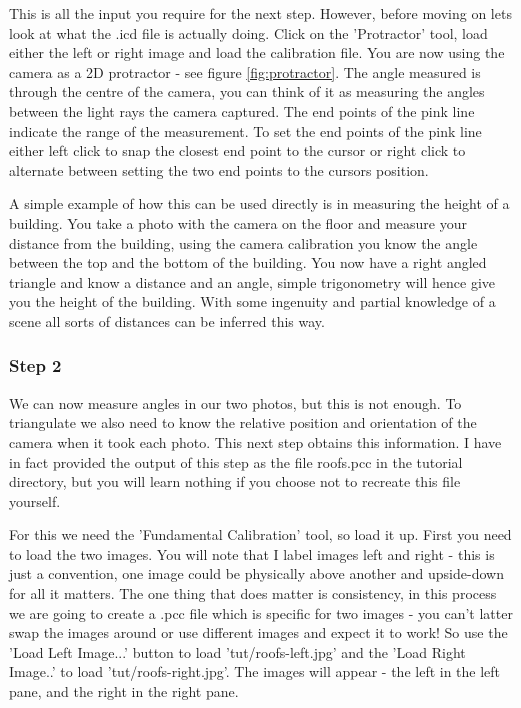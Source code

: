 \documentclass[10pt,a4paper,twoside]{article}
\begin{document}
This is all the input you require for the next step. However, before moving on lets look at what the .icd file is actually doing. Click on the 'Protractor' tool, load either the left or right image and load the calibration file. You are now using the camera as a 2D protractor - see figure \ref{fig:protractor}. The angle measured is through the centre of the camera, you can think of it as measuring the angles between the light rays the camera captured. The end points of the pink line indicate the range of the measurement. To set the end points of the pink line either left click to snap the closest end point to the cursor or right click to alternate between setting the two end points to the cursors position.

A simple example of how this can be used directly is in measuring the height of a building.
You take a photo with the camera on the floor and measure your distance from the building, using the camera calibration you know the angle between the top and the bottom of the building.
You now have a right angled triangle and know a distance and an angle, simple trigonometry will hence give you the height of the building.
With some ingenuity and partial knowledge of a scene all sorts of distances can be inferred this way.


\subsubsection {Step 2}
We can now measure angles in our two photos, but this is not enough. To triangulate we also need to know the relative position and orientation of the camera when it took each photo. This next step obtains this information. I have in fact provided the output of this step as the file roofs.pcc in the tutorial directory, but you will learn nothing if you choose not to recreate this file yourself.

For this we need the 'Fundamental Calibration' tool, so load it up. First you need to load the two images. You will note that I label images left and right - this is just a convention, one image could be physically above another and upside-down for all it matters. The one thing that does matter is consistency, in this process we are going to create a .pcc file which is specific for two images - you can't latter swap the images around or use different images and expect it to work! So use the 'Load Left Image...' button to load 'tut/roofs-left.jpg' and the 'Load Right Image..' to load 'tut/roofs-right.jpg'. The images will appear - the left in the left pane, and the right in the right pane.
\end{document}
